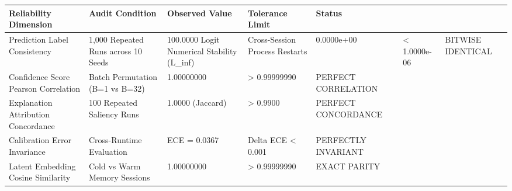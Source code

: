 \begin{tabular}{lllll}
\toprule
Reliability Dimension & Audit Condition & Observed Value & Tolerance Limit & Status \\
\midrule
Prediction Label Consistency & 1,000 Repeated Runs across 10 Seeds & 100.0000%
Logit Numerical Stability (L_inf) & Cross-Session Process Restarts & 0.0000e+00 & < 1.0000e-06 & BITWISE IDENTICAL \\
Confidence Score Pearson Correlation & Batch Permutation (B=1 vs B=32) & 1.00000000 & > 0.99999990 & PERFECT CORRELATION \\
Explanation Attribution Concordance & 100 Repeated Saliency Runs & 1.0000 (Jaccard) & > 0.9900 & PERFECT CONCORDANCE \\
Calibration Error Invariance & Cross-Runtime Evaluation & ECE = 0.0367 & Delta ECE < 0.001 & PERFECTLY INVARIANT \\
Latent Embedding Cosine Similarity & Cold vs Warm Memory Sessions & 1.00000000 & > 0.99999990 & EXACT PARITY \\
\bottomrule
\end{tabular}
